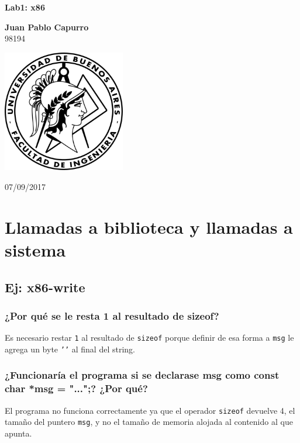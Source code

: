 \documentclass[a4paper]{article}
\newcommand{\code}[1]{\colorbox{light-gray}{\texttt{#1}}}
\begin{document}
\begin{titlepage}
    \begin{center}
        \vspace*{1.5cm}
        \huge
        \textbf{Lab1: x86 }
        \vspace{1.5cm}
        
        \Huge
        \textbf{Juan Pablo Capurro}\\
        \vspace{1cm}
        \LARGE
        98194\\
        
        \vspace{2cm}
        
        \includegraphics[width=0.4\textwidth]{logo_fiuba.png}
        \vspace{1cm}
        
        07/09/2017\\
        
    \end{center}
\end{titlepage}

\section{Llamadas a biblioteca y llamadas a sistema}
\subsection{Ej: x86-write}
    \subsubsection{¿Por qué se le resta 1 al resultado de sizeof?}
        Es necesario restar \code{1} al resultado de \code{sizeof} porque definir de esa forma a \code{msg} le agrega un byte \code{'\0'} al final del string.
    \subsubsection{¿Funcionaría el programa si se declarase msg como const char *msg = "...";? ¿Por qué?}
        El programa no funciona correctamente ya que el operador \code{sizeof} devuelve 4, el tamaño del puntero \code{msg}, y no el tamaño de memoria alojada al contenido al que apunta.
\end{document}
